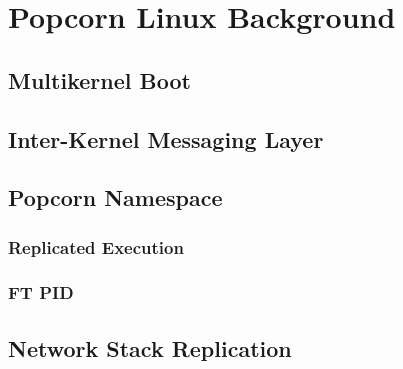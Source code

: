 \chapter{Popcorn Linux Background}
\section{Multikernel Boot}
\section{Inter-Kernel Messaging Layer}
\section{Popcorn Namespace}
\subsection{Replicated Execution}
\subsection{FT PID}
\section{Network Stack Replication}